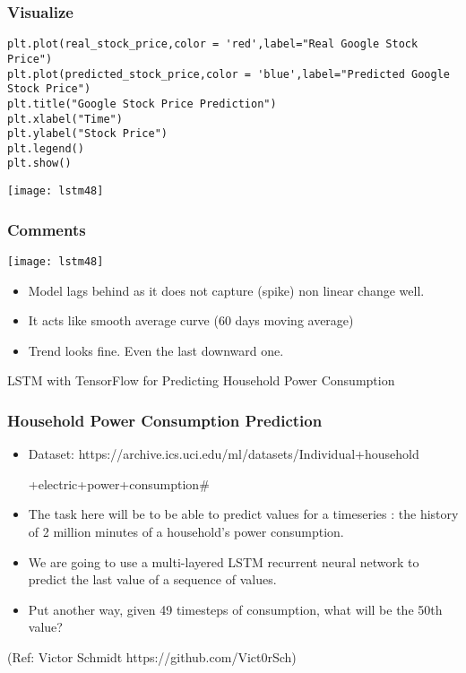 \begin{frame}[fragile] \frametitle{Visualize}
\begin{lstlisting}
plt.plot(real_stock_price,color = 'red',label="Real Google Stock Price")
plt.plot(predicted_stock_price,color = 'blue',label="Predicted Google Stock Price")
plt.title("Google Stock Price Prediction")
plt.xlabel("Time")
plt.ylabel("Stock Price")
plt.legend()
plt.show()
\end{lstlisting}
\begin{center}
\texttt{[image: lstm48]}
\end{center}
\end{frame}


\begin{frame}[fragile] \frametitle{Comments}
\begin{center}
\texttt{[image: lstm48]}
\end{center}
\begin{itemize}
\item Model lags behind as it does not capture (spike) non linear change well.
\item It acts like smooth average curve (60 days moving average)
\item Trend looks fine. Even the last downward one.
\end{itemize}
\end{frame}




\begin{frame}
  \begin{center}
    {\Large LSTM with TensorFlow for Predicting Household Power Consumption}
    
  \end{center}
\end{frame}

\begin{frame}[fragile] \frametitle{Household Power Consumption Prediction}
\begin{itemize}
\item Dataset:  https://archive.ics.uci.edu/ml/datasets/Individual+household

+electric+power+consumption\#
\item The task here will be to be able to predict values for a timeseries : the history of 2 million minutes of a household's power consumption. 
\item We are going to use a multi-layered LSTM recurrent neural network to predict the last value of a sequence of values. 
\item Put another way, given 49 timesteps of consumption, what will be the 50th value?
\end{itemize}
(Ref: Victor Schmidt https://github.com/Vict0rSch)
\end{frame}


